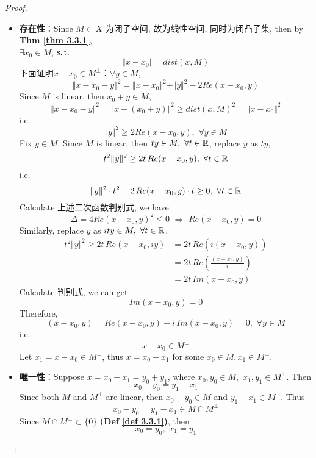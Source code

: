 \begin{thm}
		\begin{proof}
			\begin{itemize}
				\item \textbf{存在性}：Since $M \subset X$ 为闭子空间, 故为线性空间, 同时为闭凸子集, then by \textbf{Thm \ref{thm 3.3.1}}, \\
				$\exists x_0 \in M$, $\operatorname{s.t.}$
				\[ \Vert x - x_0 \vert = dist(x , M) \]
				下面证明$x - x_0 \in M^{\perp}$：$\forall y \in M$, 
				\[ \Vert x - x_0 - y \Vert^2 = \Vert x - x_0 \Vert^2 + \Vert y \Vert^2 - 2 Re(x - x_0 , y) \]
				Since $M$ is linear, then $x_0 + y \in M$, 
				\[ \Vert x - x_0 - y \Vert^2 = \Big\Vert x - (x_0 + y) \Big\Vert^2 \geq dist(x , M)^2 = \Vert x - x_0 \Vert^2 \]
				i.e.
				\[ \Vert y \Vert^2 \geq 2 Re(x - x_0 , y) , \,\, \forall y \in M \]
				Fix $y \in M$. Since $M$ is linear, then $ty \in M , \,\, \forall t \in \mathbb{R}$, replace $y$ as $ty$, 
				\[ t^2 \Vert y \Vert^2 \geq 2t \, Re(x - x_0 , y) , \,\, \forall t \in \mathbb{R} \]
				i.e.
				\[ \Vert y \Vert^2 \cdot t^2 - 2 \, Re(x - x_0 , y) \cdot t \geq 0 , \,\, \forall t \in \mathbb{R} \]
				Calculate 上述二次函数判别式, we have
				\[ \Delta = 4 Re(x - x_0 , y)^2 \leq 0 \,\, \Rightarrow \,\, Re(x - x_0 , y) = 0 \]
				Similarly, replace $y$ as $ity \in M , \,\, \forall t \in \mathbb{R}$, 
				\begin{align}
					t^2 \Vert y \Vert^2 
					\geq 2t \, Re(x - x_0 , iy) 
					&= 2t \, Re(\overline{i} (x - x_0 , y)) \\
					&= 2t \, Re \left( \frac{(x - x_0 , y)}{i} \right) \\
					&= 2t \, Im(x - x_0 , y)
				\end{align}
				Calculate 判别式, we can get 
				\[ Im(x - x_0 , y) = 0 \]
				Therefore, 
				\[ (x - x_0 , y) = Re(x - x_0 , y) + i \, Im(x - x_0 , y) = 0 , \,\, \forall y \in M \]
				i.e. 
				\[ x - x_0 \in M^{\perp} \]
				Let $x_1 = x - x_0 \in M^{\perp}$, thus $x = x_0 + x_1$ for some $x_0 \in M , x_1 \in M^{\perp}$. 
				
				\vspace{10em}
				
				\item \textbf{唯一性}：Suppose $x = x_0 + x_1 = y_0 + y_1$, where $x_0 , y_0 \in M , \,\, x_1 , y_1 \in M^{\perp}$. Then
				\[ x_0 - y_0 = y_1 - x_1 \]
				Since both $M$ and $M^{\perp}$ are linear, then $x_0 - y_0 \in M$ and $y_1 - x_1 \in M^{\perp}$. Thus
				\[ x_0 - y_0 = y_1 - x_1 \in M \cap M^{\perp} \]
				Since $M \cap M^{\perp} \subset \{ 0 \}$ \textbf{(Def \ref{def 3.3.1})}, then 
				\[ x_0 = y_0 , \,\, x_1 = y_1 \]
			\end{itemize}
		\end{proof}
	\end{thm}


